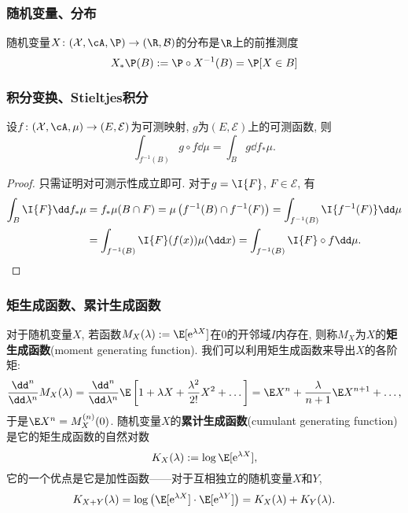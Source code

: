 \subsubsection{随机变量、分布}

随机变量$X \colon (\mathcal{X}, \cA, \P) \to (\R, \mathcal{B})$的分布是$\R$上的前推测度
\begin{equation*}
	X_* \P (B) := \P \circ X^{-1} (B) = \P[X \in B]
\end{equation*}

\subsubsection{积分变换、Stieltjes积分}

\begin{theorem}[积分变换]\label{thm:IntegralTransform}
	设$f \colon (\mathcal{X}, \cA, \mu) \to (E, \mathcal{E})$为可测映射, $g$为$(E, \mathcal{E})$上的可测函数, 则
	\begin{equation*}
		\int_{f^{-1}(B)} g \circ f \dd \mu 
		= \int_B g \dd f_* \mu. 
	\end{equation*}
\end{theorem}
\begin{proof}
	只需证明对可测示性成立即可. 
	对于$g = \I{F}$, $F \in \mathcal{E}$, 有
	\begin{align*}
		\int_B \I{F} \dd f_* \mu
		&= f_* \mu(B \cap F)
		= \mu \left( f^{-1}(B) \cap f^{-1}(F) \right)
		= \int_{f^{-1}(B)} \I{f^{-1}(F)} \dd \mu \\
		&= \int_{f^{-1}(B)} \I{F}(f(x)) \mu(\dd x)
		=\int_{f^{-1}(B)} \I{F} \circ f \dd \mu. 
	\end{align*}
\end{proof}


\subsubsection{矩生成函数、累计生成函数}

对于随机变量$X$, 若函数$M_X(\lambda) := \E[\mathrm{e}^{\lambda X}]$在$0$的开邻域$I$内存在, 则称$M_X$为$X$的\textbf{矩生成函数}(moment generating function).
我们可以利用矩生成函数来导出$X$的各阶矩: 
\begin{equation*}
	\frac{\dd^n}{\dd \lambda^n} M_X(\lambda)
	= \frac{\dd^n}{\dd \lambda^n} \E \left[ 1 + \lambda X + \frac{\lambda^2}{2!} X^2 + \dots \right]
	= \E X^n + \frac{\lambda}{n + 1} \E X^{n+1} + \dots, 
\end{equation*}
于是$\E X^n = M_X^{(n)}(0)$. 
随机变量$X$的\textbf{累计生成函数}(cumulant generating function)是它的矩生成函数的自然对数 
\begin{equation*}
	K_X(\lambda) := \log \E[\mathrm{e}^{\lambda X}], 
\end{equation*}
它的一个优点是它是加性函数——对于互相独立的随机变量$X$和$Y$, 
\begin{equation*}
	K_{X+Y}(\lambda) 
	= \log \left(\E[\mathrm{e}^{\lambda X}] \cdot \E[\mathrm{e}^{\lambda Y}]\right)
	= K_X(\lambda) + K_Y(\lambda). 
\end{equation*}
 

